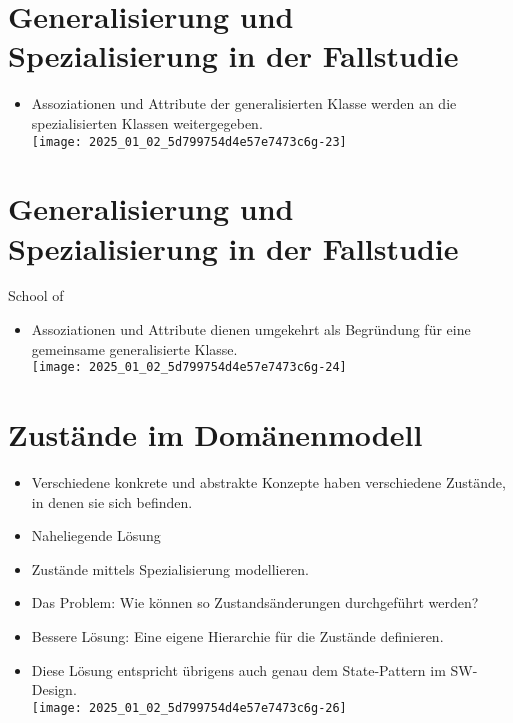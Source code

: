 \documentclass[10pt]{article}
\begin{document}
\section*{Generalisierung und Spezialisierung in der Fallstudie}
\begin{itemize}
  \item Assoziationen und Attribute der generalisierten Klasse werden an die spezialisierten Klassen weitergegeben.\\
\texttt{[image: 2025\_01\_02\_5d799754d4e57e7473c6g-23]}
\end{itemize}

\section*{Generalisierung und Spezialisierung in der Fallstudie}
School of

\begin{itemize}
  \item Assoziationen und Attribute dienen umgekehrt als Begründung für eine gemeinsame generalisierte Klasse.\\
\texttt{[image: 2025\_01\_02\_5d799754d4e57e7473c6g-24]}
\end{itemize}

\section*{Zustände im Domänenmodell}
\begin{itemize}
  \item Verschiedene konkrete und abstrakte Konzepte haben verschiedene Zustände, in denen sie sich befinden.
  \item Naheliegende Lösung
  \item Zustände mittels Spezialisierung modellieren.
  \item Das Problem: Wie können so Zustandsänderungen durchgeführt werden?
  \item Bessere Lösung: Eine eigene Hierarchie für die Zustände definieren.
  \item Diese Lösung entspricht übrigens auch genau dem State-Pattern im SW-Design.\\
\texttt{[image: 2025\_01\_02\_5d799754d4e57e7473c6g-26]}
\end{itemize}
\end{document}
